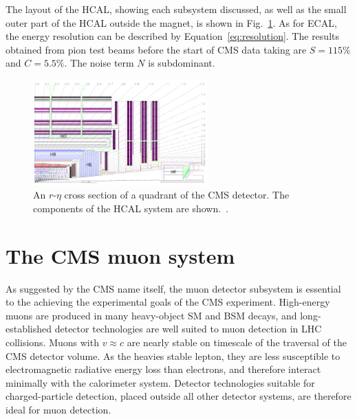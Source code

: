 The layout of the HCAL, showing each subsystem discussed, as well as the small
outer part of the HCAL outside the magnet, is shown in Fig.~\ref{fig:hcal}.
As for ECAL, the energy resolution can be described by Equation~\ref{eq:resolution}.
The results obtained from pion test beams before the start of CMS
data taking are $S=115\%$ and $C = 5.5\%$. The noise term $N$ is subdominant.

\begin{figure}[htbp]
  \centering
   \includegraphics[width=0.6\textwidth]{figures/LHCandCMS/HCAL.png}
  \caption[An $r$-$\eta$ cross section of a quadrant of the CMS detector, showing the 
      HCAL system]{
    An $r$-$\eta$ cross section of a quadrant of the CMS detector. The components
    of the HCAL system are shown.~\cite{Chatrchyan:2012xdj}.
        }
 \label{fig:hcal}
\end{figure}

\section{The CMS muon system}

As suggested by the CMS name itself, the muon detector subsystem is essential to the
achieving the experimental goals of the CMS experiment. 
High-energy muons are produced in many heavy-object SM and BSM 
decays, and long-established detector technologies are well suited to muon detection in LHC collisions.
Muons with $v\approx c$ are nearly stable
on timescale of the traversal of the CMS detector volume. As the heavies stable lepton, 
they are less susceptible to electromagnetic radiative energy loss than electrons, and therefore
interact minimally with the calorimeter system. Detector technologies suitable for
charged-particle detection, placed outside all other detector systems, 
are therefore ideal for muon detection. 

